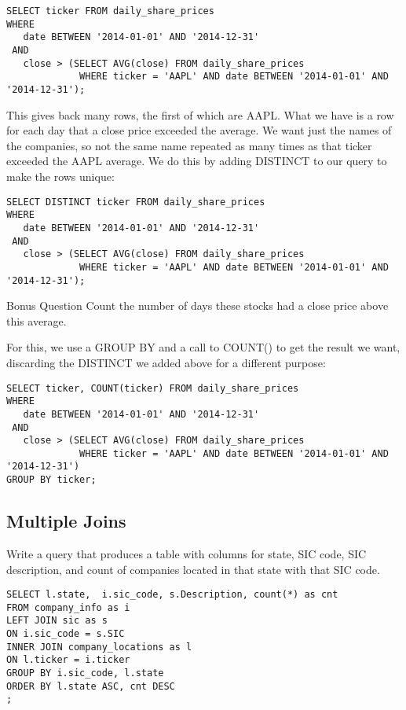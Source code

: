 \documentclass[10pt]{exam}
\begin{document}
\begin{questions}
\begin{solution}
\begin{lstlisting}
SELECT ticker FROM daily_share_prices
WHERE
   date BETWEEN '2014-01-01' AND '2014-12-31'
 AND
   close > (SELECT AVG(close) FROM daily_share_prices
             WHERE ticker = 'AAPL' AND date BETWEEN '2014-01-01' AND '2014-12-31');
\end{lstlisting}
This gives back many rows, the first of which are AAPL.
What we have is a row for each day that a close price exceeded the average.
We want just the names of the companies, so not the same name repeated
as many times as that ticker exceeded the AAPL average.
We do this by adding DISTINCT to our query to make the rows unique:
\begin{lstlisting}
SELECT DISTINCT ticker FROM daily_share_prices
WHERE
   date BETWEEN '2014-01-01' AND '2014-12-31'
 AND
   close > (SELECT AVG(close) FROM daily_share_prices
             WHERE ticker = 'AAPL' AND date BETWEEN '2014-01-01' AND '2014-12-31');
\end{lstlisting}
\end{solution}

Bonus Question  Count the number of days these stocks had a close price above this average.

\begin{solution}
For this, we use a GROUP BY and a call to COUNT() to get the result we want,
discarding the DISTINCT we added above for a different purpose:
\begin{lstlisting}  
SELECT ticker, COUNT(ticker) FROM daily_share_prices
WHERE
   date BETWEEN '2014-01-01' AND '2014-12-31'
 AND
   close > (SELECT AVG(close) FROM daily_share_prices
             WHERE ticker = 'AAPL' AND date BETWEEN '2014-01-01' AND '2014-12-31')
GROUP BY ticker;
\end{lstlisting}
\end{solution}


\subsection*{Multiple Joins}

\question Write a query that produces a table with columns for state, SIC
code, SIC description, and count of companies located in that state
with that SIC code.

% 
\begin{solution}
\begin{lstlisting}
SELECT l.state,  i.sic_code, s.Description, count(*) as cnt
FROM company_info as i
LEFT JOIN sic as s
ON i.sic_code = s.SIC
INNER JOIN company_locations as l
ON l.ticker = i.ticker
GROUP BY i.sic_code, l.state
ORDER BY l.state ASC, cnt DESC
;
\end{lstlisting}



\end{solution}
\end{questions}
\end{document}
